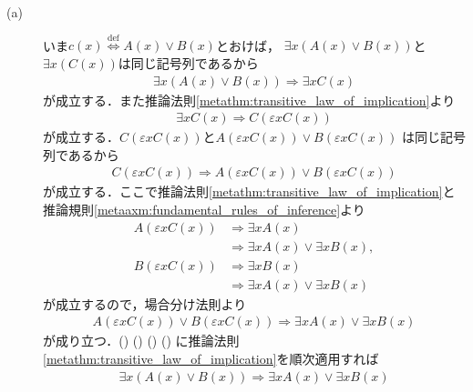 	\begin{prf}\mbox{}
		\begin{description}
			\item[(a)]
				いま$c(x) \overset{\mathrm{def}}{\Longleftrightarrow} A(x) \vee B(x)$とおけば，
				$\exists x ( A(x) \vee B(x) )$と$\exists x ( C(x) )$は同じ記号列であるから
				\begin{align}
					\exists x ( A(x) \vee B(x) ) \Longrightarrow \exists x C(x)
					\label{eq:metathm_properties_of_quantifiers_1}
				\end{align}
				が成立する．また推論法則\ref{metathm:transitive_law_of_implication}より
				\begin{align}
					\exists x C(x) \Longrightarrow C(\varepsilon x C(x))
					\label{eq:metathm_properties_of_quantifiers_2}
				\end{align}
				が成立する．$C(\varepsilon x C(x))$と$A(\varepsilon x C(x)) \vee B(\varepsilon x C(x))$
				は同じ記号列であるから
				\begin{align}
					C(\varepsilon x C(x)) \Longrightarrow A(\varepsilon x C(x)) \vee B(\varepsilon x C(x))
					\label{eq:metathm_properties_of_quantifiers_3}
				\end{align}
				が成立する．ここで推論法則\ref{metathm:transitive_law_of_implication}と
				推論規則\ref{metaaxm:fundamental_rules_of_inference}より
				\begin{align}
					A(\varepsilon x C(x)) &\Longrightarrow \exists x A(x) \\
						&\Longrightarrow \exists x A(x) \vee \exists x B(x), \\
					B(\varepsilon x C(x)) &\Longrightarrow \exists x B(x) \\
						&\Longrightarrow \exists x A(x) \vee \exists x B(x)
				\end{align}
				が成立するので，場合分け法則より
				\begin{align}
					A(\varepsilon x C(x)) \vee B(\varepsilon x C(x))
					\Longrightarrow \exists x A(x) \vee \exists x B(x)
					\label{eq:metathm_properties_of_quantifiers_4}
				\end{align}
				が成り立つ．()
				()
				()
				()
				に推論法則\ref{metathm:transitive_law_of_implication}を順次適用すれば
				\begin{align}
					\exists x ( A(x) \vee B(x) ) \Longrightarrow \exists x A(x) \vee \exists x B(x)

\end{align}
\end{description}
\end{prf}
